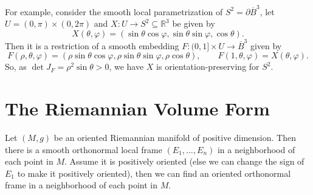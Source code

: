 \documentclass[../main.tex]{subfiles}
\begin{document}
For example, consider the smooth local parametrization of $S^2 = \partial \overline{B}^3$, let $U = (0, \pi) \times (0, 2\pi)$ and $X: U \to S^2 \subseteq \mathbb{R}^3$ be given by
\begin{equation*}
  X(\theta, \varphi) = (\sin \theta \cos \varphi, \sin \theta \sin \varphi, \cos \theta).
\end{equation*}
Then it is a restriction of a smooth embedding $F: (0, 1] \times U \to \overline{B}^3$ given by
\begin{equation*}
  F(\rho, \theta, \varphi) = (\rho \sin \theta \cos \varphi, \rho \sin \theta \sin \varphi, \rho \cos \theta), \qquad F(1, \theta, \varphi) = X(\theta, \varphi).
\end{equation*}
So, as $\det J_F = \rho^2 \sin \theta > 0$, we have $X$ is orientation-preserving for $S^2$.

\section{The Riemannian Volume Form}
Let $(M,g)$ be an oriented Riemannian manifold of positive dimension. Then there is a smooth orthonormal local frame $(E_1, \ldots , E_n)$ in a neighborhood of each point in $M$. Assume it is positively oriented (else we can change the sign of $E_1$ to make it positively oriented), then we can find an oriented orthonormal frame in a neighborhood of each point in $M$.
\end{document}
